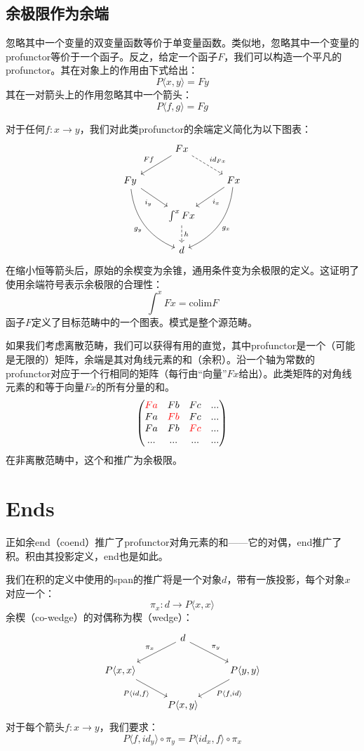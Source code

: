 \documentclass[DaoFP]{subfiles}
\begin{document}
\subsection{余极限作为余端}
忽略其中一个变量的双变量函数等价于单变量函数。类似地，忽略其中一个变量的profunctor等价于一个函子。反之，给定一个函子$F$，我们可以构造一个平凡的profunctor。其在对象上的作用由下式给出：
\[P \langle x, y \rangle = F y \]
其在一对箭头上的作用忽略其中一个箭头：
\[P \langle f, g \rangle = F g \]

对于任何$f \colon x \to y$，我们对此类profunctor的余端定义简化为以下图表：
\[
 \begin{tikzcd}
 & F x
 \arrow[ld, "F f"']
 \arrow[rd, dashed, "id_{F x}"]
 \\
 F y
 \arrow[dr, "i_y"']
 \arrow[ddr, bend right,  "g_y"']
 && F x
 \arrow[dl, "i_x"]
 \arrow[ddl, bend left,  "g_x"]
 \\
 &\int^x F x
 \arrow[d, dashed, "h"]
 \\
 &d
 \end{tikzcd}
\]
在缩小恒等箭头后，原始的余楔变为余锥，通用条件变为余极限的定义。这证明了使用余端符号表示余极限的合理性：
\[ \int^x F x = \text{colim} F \]
函子$F$定义了目标范畴中的一个图表。模式是整个源范畴。

如果我们考虑离散范畴，我们可以获得有用的直觉，其中profunctor是一个（可能是无限的）矩阵，余端是其对角线元素的和（余积）。沿一个轴为常数的profunctor对应于一个行相同的矩阵（每行由“向量”$F x$给出）。此类矩阵的对角线元素的和等于向量$F x$的所有分量的和。
\[
\begin{pmatrix}
\color{red} F a & F b & F c & ... \\
F a & \color{red}F b & F c & ...\\
F a & F b &\color{red}F c & ...\\
... & ... & ... & ...
\end{pmatrix}
\]
在非离散范畴中，这个和推广为余极限。

\section{Ends}

正如余end（coend）推广了profunctor对角元素的和——它的对偶，end推广了积。积由其投影定义，end也是如此。

我们在积的定义中使用的span的推广将是一个对象$d$，带有一族投影，每个对象$x$对应一个：
\[ \pi_x \colon d \to P \langle x, x \rangle \]
余楔（co-wedge）的对偶称为楔（wedge）：
\[
 \begin{tikzcd}
 &d
 \arrow[ld, "\pi_x"']
 \arrow[rd, "\pi_y"]
 \\
 P \langle x, x \rangle
 \arrow[dr, "{P \langle id, f \rangle}"']
 &&P \langle y, y \rangle
 \arrow[dl, "{P \langle f, id \rangle}"]
 \\
 & P \langle x, y \rangle
 \end{tikzcd}
\]
对于每个箭头$f \colon x \to y$，我们要求：
\[ P \langle f, id_y \rangle \circ \pi_y = P \langle id_x, f \rangle \circ \pi_x \]
\end{document}
